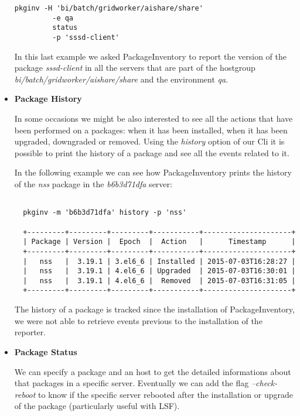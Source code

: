 \begin{itemize}
  \begin{lstlisting}[frame=single]
  pkginv -H 'bi/batch/gridworker/aishare/share'
         -e qa
         status
         -p 'sssd-client'
  \end{lstlisting}

  In this last example we asked PackageInventory to report the version of
  the package \textit{sssd-client} in all the servers that are part of the
  hostgroup \textit{bi/batch/gridworker/aishare/share} and the environment
  \textit{qa}.
  
  \item \textbf{Package History}

  In some occasions we might be also interested to see all the actions
  that have been performed on a packages: when it has been installed, when
  it has been upgraded, downgraded or removed. Using the \textit{history}
  option of our Cli it is possible to print the history of a package and
  see all the events related to it.

  In the following example we can see how PackageInventory prints the
  history of the \textit{nss} package in the \textit{b6b3d71dfa} server:
  \newline{}

  \begin{lstlisting}[frame=single,basicstyle=\footnotesize\ttfamily]
  
  pkginv -m 'b6b3d71dfa' history -p 'nss'
  
  +---------+---------+---------+-----------+---------------------+
  | Package | Version |  Epoch  |  Action   |      Timestamp      |
  +---------+---------+---------+-----------+---------------------+
  |   nss   |  3.19.1 | 3.el6_6 | Installed | 2015-07-03T16:28:27 |
  |   nss   |  3.19.1 | 4.el6_6 | Upgraded  | 2015-07-03T16:30:01 |
  |   nss   |  3.19.1 | 4.el6_6 |  Removed  | 2015-07-03T16:31:05 |
  +---------+---------+---------+-----------+---------------------+
  \end{lstlisting}

  The history of a package is tracked since the installation of
  PackageInventory, we were not able to retrieve events previous to the
  installation of the reporter.
 
  \item \textbf{Package Status}

  We can specify a package and an host to get the detailed informations
  about that packages in a specific server. Eventually we can add the flag
  \textit{--check-reboot} to know if the specific server rebooted after
  the installation or upgrade of the package (particularly useful with
  LSF).
 

\end{itemize}
